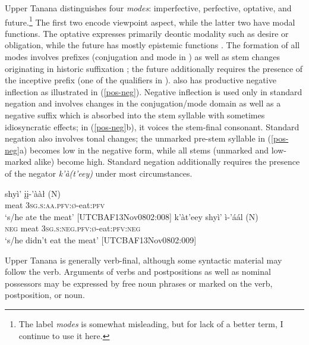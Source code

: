 \documentclass[output=paper,colorlinks,citecolor=brown]{langscibook}
\begin{document}
Upper Tanana distinguishes four \textit{modes}: imperfective, perfective, optative, and future.\footnote{The label \textit{modes} is somewhat misleading, but for lack of a better term, I continue to use it here.} The first two encode viewpoint aspect, while the latter two have modal functions. The optative expresses primarily deontic modality such as desire or obligation, while the future has mostly epistemic functions \citep{LovickO2017}. The formation of all modes involves prefixes (conjugation and mode in ) as well as stem changes originating in historic suffixation \citep{LeerJ1979}; the future additionally requires the presence of the inceptive prefix (one of the qualifiers in ).  also has productive negative inflection as illustrated in (\ref{pos-neg}). Negative inflection is used only in standard negation and involves changes in the conjugation/mode domain as well as a negative suffix which is absorbed into the stem syllable with sometimes idiosyncratic effects; in (\ref{pos-neg}b), it voices the stem-final consonant. Standard negation also involves tonal changes; the unmarked pre-stem syllable in (\ref{pos-neg}a) becomes low in the negative form, while all stems (unmarked and low-marked alike) become high. Standard negation additionally requires the presence of the negator \textit{k'à(t'eey)} under most circumstances.

\begin{exe}
\ex \label{pos-neg}
\begin{xlista}
\ex
\gll shyì' {įį-'ààł \textnormal{(N)}}\\
meat \textsc{3sg.s:aa.pfv:ø}-eat:\textsc{pfv} \\
\glt `s/he ate the meat'  \hfill [UTCBAF13Nov0802:008]
\ex 
\gll k'àt'eey shyì' {ì-'áál \textnormal{(N)}}\\
\textsc{neg} meat \textsc{3sg.s:neg.pfv:ø}-eat:\textsc{pfv:neg} \\
\glt `s/he didn't eat the meat'  \hfill [UTCBAF13Nov0802:009] 
\end{xlista}
\end{exe}


Upper Tanana is generally verb-final, although some syntactic material may follow the verb. Arguments of verbs and postpositions as well as nominal possessors may be expressed by free noun phrases or marked on the verb, postposition, or noun.%
\end{document}

